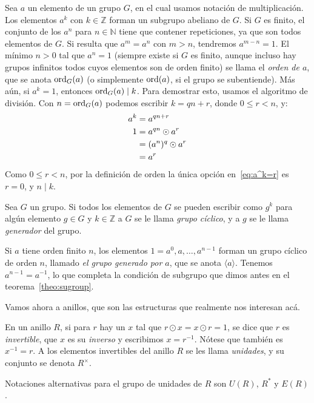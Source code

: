   Sea \(a\) un elemento de un grupo \(G\),
  en el cual usamos notación de multiplicación.
  Los elementos \(a^k\) con \(k \in \mathbb{Z}\)
  forman un subgrupo abeliano de \(G\).%
  Si \(G\) es finito,
  el conjunto de los \(a^n\) para \(n \in \mathbb{N}\)
  tiene que contener repeticiones,
  ya que son todos elementos de \(G\).
  Si resulta que \(a^m = a^n\) con \(m > n\),
  tendremos \(a^{m - n} = 1\).
  El mínimo \(n > 0\) tal que \(a^n = 1\)
  (siempre existe si \(G\) es finito,
   aunque incluso hay grupos infinitos
   todos cuyos elementos son de orden finito)
  se llama el \emph{orden de \(a\)},%
  que se anota \(\operatorname{ord}_G(a)\)
  (o simplemente \(\operatorname{ord}(a)\),
   si el grupo se subentiende).
  Más aún,
  si \(a^k = 1\),
  entonces \(\operatorname{ord}_G(a) \mid k\).
  Para demostrar esto,
  usamos el algoritmo de división.%
  Con \(n = \operatorname{ord}_G(a)\)
  podemos escribir \(k = q n + r\),
  donde \(0 \le r < n\),
  y:
  \begin{align}
    a^k
      &= a^{q n + r} \notag \\
    1
      &= a^{q n} \odot a^r \notag \\
      &= (a^n)^q \odot a^r \notag \\
      &= a^r  \label{eq:a^k=r}
  \end{align}
  Como \(0 \le r < n\),
  por la definición de orden la única opción en~\eqref{eq:a^k=r} es \(r = 0\),
  y \(n \mid k\).

  \begin{definition}
    \label{def:grupo-ciclico}
    Sea \(G\) un grupo.
    Si todos los elementos de \(G\) se pueden escribir como
    \(g^k\) para algún elemento \(g \in G\) y \(k \in \mathbb{Z}\)
    a \(G\) se le llama \emph{grupo cíclico},
    y a \(g\) se le llama
    \emph{generador} del grupo.%
  \end{definition}
  Si \(a\) tiene orden finito \(n\),
  los elementos \(1 = a^0, a, \dotsc, a^{n - 1}\)
  forman un grupo cíclico de orden \(n\),
  llamado \emph{el grupo generado por \(a\)},
  que se anota \(\langle a \rangle\).
  Tenemos \(a^{n - 1} = a^{-1}\),
  lo que completa la condición de subgrupo que dimos antes
  en el teorema~\ref{theo:sugroup}.

  Vamos ahora a anillos,
  que son las estructuras que realmente nos interesan acá.
  \begin{definition}
    \label{def:ring-unit}
    En un anillo \(R\),
    si para \(r\) hay un \(x\) tal que \(r \odot x = x \odot r = 1\),
    se dice que \(r\) es \emph{invertible},
    que \(x\) es su \emph{inverso}
    y escribimos \(x = r^{-1}\).
    Nótese que también es \(x^{-1} = r\).
    A los elementos invertibles del anillo \(R\)
    se les llama \emph{unidades},
    y su conjunto se denota \(R^\times\).
  \end{definition}
  Notaciones alternativas para el grupo de unidades de \(R\) son
  \(U(R)\), \(R^*\) y \(E(R)\).

